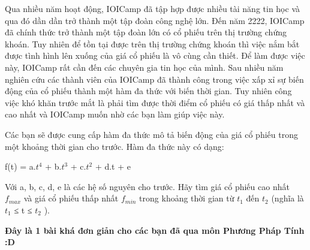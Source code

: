 Qua nhiều năm hoạt động, IOICamp đã tập hợp được nhiều tài năng tin học và qua đó dần dần trở thành một tập đoàn công nghệ lớn. Đến năm 2222, IOICamp đã chính thức trở thành một tập đoàn lớn có cổ phiếu trên thị trường chứng khoán. Tuy nhiên để tồn tại được trên thị trường chứng khoán thì việc nắm bắt được tình hình lên xuống của giá cổ phiếu là vô cùng cần thiết. Để làm được việc này, IOICamp rất cần đến các chuyên gia tin học của mình. Sau nhiều năm nghiên cứu các thành viên của IOICamp đã thành công trong việc xấp xỉ sự biến động của cổ phiếu thành một hàm đa thức với biến thời gian. Tuy nhiên công việc khó khăn trước mắt là phải tìm được thời điểm cổ phiếu có giá thấp nhất và cao nhất và IOICamp muốn nhờ các bạn làm giúp việc này.

Các bạn sẽ được cung cấp hàm đa thức mô tả biến động của giá cổ phiếu trong một khoảng thời gian cho trước. Hàm đa thức này có dạng:

f(t) = a.$t^{4}$ + b.$t^{3}$ + c.$t^{2}$ + d.t + e

Với a, b, c, d, e là các hệ số nguyên cho trước. Hãy tìm giá cổ phiếu cao nhất $f_{max}$ và giá cổ phiếu thấp nhất $f_{min}$ trong khoảng thời gian từ $t_{1}$ đến $t_{2}$ (nghĩa là $t_{1}$ ≤ t ≤ $t_{2}$ ).

\textbf{Đ}\textbf{ây là 1 bài khá đơn giản cho các bạn đã qua môn Phương Pháp Tính :D }